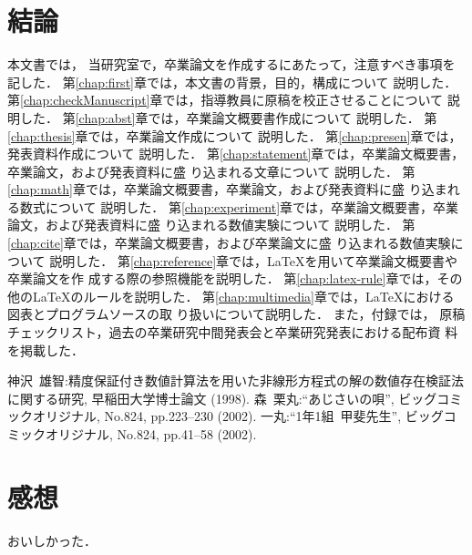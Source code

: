 \documentclass[a4j,12pt,dvipdfmx,oneside]{jsbook}
\theoremstyle{definition}
\begin{document}
\chapter{結論}\label{chap:conclusion}
本文書では，
当研究室で，卒業論文を作成するにあたって，注意すべき事項を記した．
第\ref{chap:first}章では，本文書の背景，目的，構成について
説明した．
第\ref{chap:checkManuscript}章では，指導教員に原稿を校正させることについて
説明した．
第\ref{chap:abst}章では，卒業論文概要書作成について
説明した．
第\ref{chap:thesis}章では，卒業論文作成について
説明した．
第\ref{chap:presen}章では，発表資料作成について
説明した．
第\ref{chap:statement}章では，卒業論文概要書，卒業論文，および発表資料に盛
り込まれる文章について
説明した．
第\ref{chap:math}章では，卒業論文概要書，卒業論文，および発表資料に盛
り込まれる数式について
説明した．
第\ref{chap:experiment}章では，卒業論文概要書，卒業論文，および発表資料に盛
り込まれる数値実験について
説明した．
第\ref{chap:cite}章では，卒業論文概要書，および卒業論文に盛
り込まれる数値実験について
説明した．
第\ref{chap:reference}章では，\LaTeX{}を用いて卒業論文概要書や卒業論文を作
成する際の参照機能を説明した．
第\ref{chap:latex-rule}章では，その他の\LaTeX{}のルールを説明した．
第\ref{chap:multimedia}章では，\LaTeX{}における図表とプログラムソースの取
り扱いについて説明した．
また，付録では，
原稿チェックリスト，過去の卒業研究中間発表会と卒業研究発表における配布資
料を掲載した．
%
%
%
%
%
%
\begin{thebibliography}{99}
神沢~雄智:精度保証付き数値計算法を用いた非線形方程式の解の数値存在検証法に関する研究, 早稲田大学博士論文 (1998).
森~栗丸:``あじさいの唄'', ビッグコミックオリジナル, No.824, pp.223--230 (2002).
一丸:``1年1組~甲斐先生'', ビッグコミックオリジナル, No.824, pp.41--58 (2002).
\end{thebibliography}
\chapter*{感想}
\label{chap:feel}
おいしかった．
\end{document}
